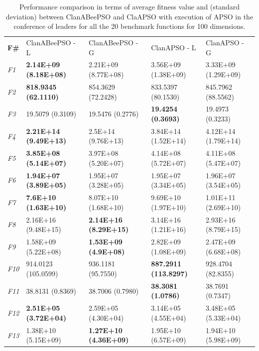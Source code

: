 \begin{table}[!h]
\caption{\small{Performance comparison in terms of average fitness value and (standard deviation) between ClanABeePSO and ClaAPSO with execution of APSO in the conference of leaders for all the 20 benchmark functions for 100 dimensions.}}
\label{tab:Comparison_ClanABeePSO_APSO}
\begin{center}
\begin{tabular}{p{0.5cm}|p{2.5cm}|p{2.5cm}|p{2.5cm}|p{2.5cm}}
\hline\noalign{\smallskip}
\textbf{F\#}	& ClanABeePSO - L & ClanABeePSO - G & ClanAPSO - L & ClanAPSO - G \\		
\noalign{\smallskip}
\hline
\noalign{\smallskip}
\textit{F1}  & \textbf{2.14E+09 (8.18E+08)} & 2.21E+09 (8.77E+08) & 3.56E+09 (1.38E+09) & 3.33E+09 (1.29E+09)\\
\textit{F2}  & \textbf{818.9345 (62.1110)} & 854.3629 (72.2428) & 833.5397 (80.1530) & 845.7962 (88.5562)\\
\textit{F3}  & 19.5079 (0.3109) & 19.5476 (0.2776) & \textbf{19.4254 (0.3693)} & 19.4973 (0.3233)\\
\textit{F4}  & \textbf{2.21E+14 (9.49E+13)} & 2.5E+14 (9.76E+13) & 3.84E+14 (1.52E+14) & 4.12E+14 (1.79E+14)\\
\textit{F5}  & \textbf{3.85E+08 (5.14E+07)} & 3.97E+08 (5.20E+07) & 4.14E+08 (5.72E+07) & 4.11E+08 (5.47E+07)\\
\textit{F6}  & \textbf{1.94E+07 (3.89E+05)} & 1.95E+07 (3.28E+05) & 1.95E+07 (3.34E+05) & 1.96E+07 (3.54E+05)\\
\textit{F7}  & \textbf{7.6E+10 (1.63E+10)} & 8.07E+10 (1.68E+10) & 9.69E+10 (1.97E+10) & 1.01E+11 (2.69E+10)\\
\textit{F8}  & 2.16E+16 (9.48E+15) & \textbf{2.14E+16 (8.29E+15)} & 3.14E+16 (1.21E+16) & 2.93E+16 (8.79E+15)\\
\textit{F9}  & 1.58E+09 (5.22E+08) & \textbf{1.53E+09 (4.9E+08)} & 2.82E+09 (1.08E+09) & 2.47E+09 (6.68E+08)\\
\textit{F10} & 914.0123 (105.0599) & 936.1181 (95.7550) & \textbf{887.2911 (113.8297)} & 928.4704 (82.8355)\\
\textit{F11} & 38.8131 (0.8369) & 38.7006 (0.7980) & \textbf{38.3081 (1.0786)} & 38.7691 (0.7347)\\
\textit{F12} & \textbf{2.51E+05 (3.72E+04)} & 2.59E+05 (4.30E+04) & 3.14E+05 (4.55E+04) & 3.48E+05 (5.33E+04)\\
\textit{F13} & 1.38E+10 (5.15E+09) & \textbf{1.27E+10 (4.36E+09)} & 1.95E+10 (6.57E+09) & 1.94E+10 (5.98E+09)\\

\end{tabular}
\end{center}
\end{table}
